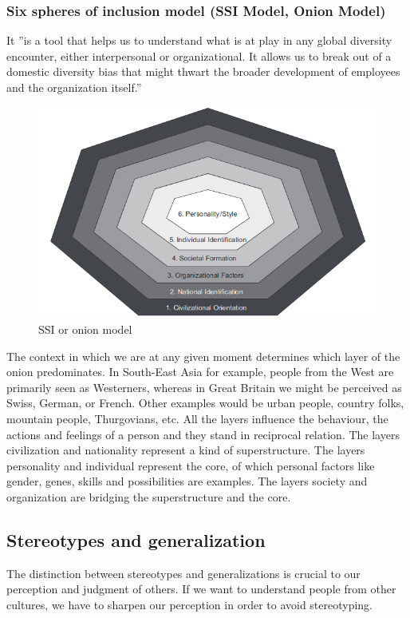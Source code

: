 \subsubsection{Six spheres of inclusion model (SSI Model, Onion Model)}
It ''is a tool that helps us to understand what is at play in any global diversity encounter, either interpersonal or organizational. It allows us to break out of a domestic diversity bias that might thwart the broader development of employees and the organization itself.''
\begin{figure}[H]
	\centering
	\includegraphics[width=.9\textwidth]{figures/ssiModelCulture.png}
	\caption{SSI or onion model}
\end{figure}
The context in which we are at any given moment determines which layer of the onion predominates. In South-East Asia for example, people from the West are primarily seen as Westerners, whereas in Great Britain we might be perceived as Swiss, German, or French. Other examples would be urban people, country folks, mountain people, Thurgovians, etc. All the layers influence the behaviour, the actions and feelings of a person and they stand in reciprocal relation. The layers civilization and nationality represent a kind of superstructure. The layers personality and individual represent the core, of which personal factors like gender, genes, skills and possibilities are examples. The layers society and organization are bridging the superstructure and the core.

\subsection{Stereotypes and generalization}
The distinction between stereotypes and generalizations is crucial to our perception and judgment of others. If we want to understand people from other cultures, we have to sharpen our perception in order to avoid stereotyping.

